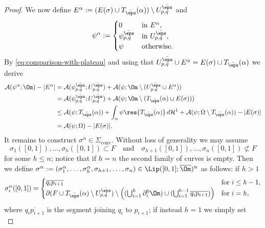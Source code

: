 \begin{proof}
We now define $E^\alpha:=(E(\sigma)\cup T_{\bar\eps}(\alpha))\setminus U^{\bar\eps}_{p,q}$ and
\begin{equation*}
\psi^\alpha:=\begin{cases}
0&\text{in}\ E^\alpha,\\
\psi^{\bar\eps}_{p,q}& \text{in}\ U^{\bar\eps}_{p,q}, \\
\psi& \text{otherwise}.
\end{cases}
\end{equation*}
By \eqref{eq:comparison-with-plateau} and using that $U^{\bar\eps}_{p,q}\cup E^\alpha=E(\sigma)\cup T_{\bar\eps}(\alpha)$ we derive
\begin{align}
\mathcal{A}(\psi^\alpha;\Om)-|E^\alpha|
&= \mathcal A(\psi^{\bar\eps}_{p,q};U^{\bar\eps}_{p,q})+
\mathcal{A}(\psi; \Om\setminus(U^{\bar\eps}_{p,q}\cup E^\alpha))\notag
\\
&= \mathcal A(\psi^{\bar\eps}_{p,q};U^{\bar\eps}_{p,q})+
\mathcal{A}(\psi; \Om\setminus(T_{\bar\eps}(\alpha)\cup E(\sigma)))\notag\\[-8pt]\label{eq:area_psi'}\\[-8pt]
&\le \mathcal A(\psi; T_{\bar\eps}(\alpha))+
\int_{\alpha}\psi\res{T_{\bar\eps}(\alpha)}\,d\mathcal{H}^1+\mathcal{A}(\psi; \Omega\setminus T_{\bar\eps}(\alpha))-|E(\sigma)|\notag
\\
&=\mathcal{A}(\psi; \Omega)-|E(\sigma)|.\notag
\end{align}
It remains to construct $\sigma^\alpha\in \Sigma_\mathrm{conv}$. Without loss of generality we may assume
\[
\sigma_1([0,1]),\dots,\sigma_h([0,1])\subset F\quad\text{and}\quad \sigma_{h+1}([0,1]),\dots,\sigma_n([0,1])\not\subset F
\]
for some $h\le n$; notice that if $h=n$ the second family of curves is empty. Then we define $\sigma^\alpha:=(\sigma^\alpha_1,\dots,\sigma_h^\alpha,\sigma_{h+1},\dots,\sigma_n)\in\Lip([0,1];\overline\Om)^n$ as follows: if $h>1$
\begin{equation*}
\sigma^\alpha_{i}([0,1])=\begin{cases}
\overline{q_{i}p_{i+1}}&\text{for } i\leq h-1,\\
\partial (F\cup T_{\bar\eps}(\alpha)\setminus U^{\bar{\eps}}_{p,q})\setminus\Bigl((\bigcup_{i=1}^{h}\partial^0_i\Om)\cup
(\bigcup_{i=1}^{h-1}\overline{q_{i}p_{i+1}})\Bigr)&\text{for } i=h,
\end{cases}
\end{equation*}
where $ \overline{q_{i}p_{i+1}}$ is the segment joining $q_i$ to $p_{i+1}$; if instead $h=1$ we simply set
\begin{equation*}

\end{equation*}
\end{proof}
